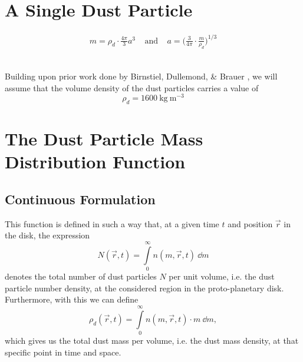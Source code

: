 \section{A Single Dust Particle}

    \begin{align}
        m
            =\rho_d\cdot\frac{4\pi}{3}a^3
        \ \ \ \ \ \text{and}\ \ \ \ \
        a
            =\bigg(\frac{3}{4\pi}\cdot\frac{m}{\rho_d}\bigg)^{1/3}
    \end{align}

     \\

    Building upon prior work done by Birnstiel, Dullemond, \& Brauer %
    \cite{birnstiel_dullemond_brauer_2010}, we will assume that the volume density of the dust 
    particles carries a value of
    $$\rho_d=\SI{1600}{\kilogram\ \meter^{-3}}$$

\section{The Dust Particle Mass Distribution Function}
    \subsection{Continuous Formulation}

        This function is defined in such a way that, at a given time $t$ and position $\vec r$ 
        in the disk, the expression
        \begin{equation}
            N(\vec r, t)
                =\int\limits_0^\infty n(m,\vec r, t)\ \dd m
        \end{equation}
        denotes the total number of dust particles $N$ per unit volume, i.e. the dust particle
        number density, at the considered region in the proto-planetary disk. \\

        Furthermore, with this we can define 
        \begin{equation}
            \rho_d(\vec r, t)
                =\int\limits_0^\infty n(m,\vec r, t)\cdot m\ \dd m,
        \end{equation}
        which gives us the total dust mass per volume, i.e. the dust mass density, 
        at that specific point in time and space.

